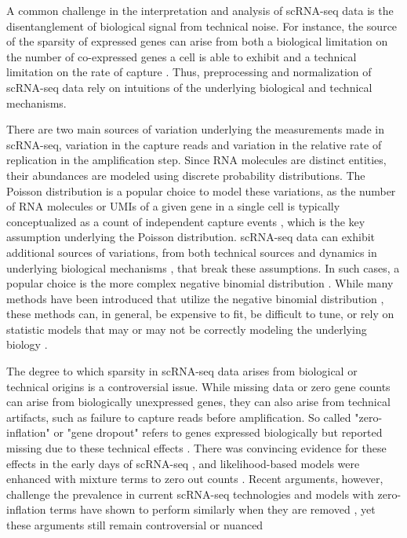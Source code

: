 A common challenge in the interpretation and analysis of scRNA-seq data is the disentanglement of biological signal from technical noise.
For instance, the source of the sparsity of expressed genes can arise from both a biological limitation on the number of co-expressed genes a cell is able to exhibit and a technical limitation on the rate of capture \cite{breda2021}.
Thus, preprocessing and normalization of scRNA-seq data rely on intuitions of the underlying biological and technical mechanisms.

There are two main sources of variation underlying the measurements made in scRNA-seq,
variation in the capture reads and variation in the relative rate of replication in the amplification step.
Since RNA molecules are distinct entities, their abundances are modeled using discrete probability distributions.
The Poisson distribution is a popular choice to model these variations,
as the number of RNA molecules or UMIs of a given gene in a single cell is typically conceptualized as a count of independent capture events \cite{breda2021,more},
which is the key assumption underlying the Poisson distribution.
scRNA-seq data can exhibit additional sources of variations, from both technical sources and dynamics in underlying biological mechanisms \cite{need},
that break these assumptions.
In such cases, a popular choice is the more complex negative binomial distribution \cite{choudhary2022}.
While many methods have been introduced that utilize the negative binomial distribution \cite{lopez2018, risso2018, eraslan2019},
these methods can, in general, be expensive to fit, be difficult to tune, or rely on statistic models that may or may not be correctly modeling the underlying biology \cite{ahlmann-eltze2023}.

The degree to which sparsity in scRNA-seq data arises from biological or technical origins is a controversial issue.
While missing data or zero gene counts can arise from biologically unexpressed genes, they can also arise from technical artifacts,
such as failure to capture reads before amplification.
So called "zero-inflation" or "gene dropout" refers to genes expressed biologically but reported missing due to these technical effects \cite{silverman2020}.
There was convincing evidence for these effects in the early days of scRNA-seq \cite{vallejos2017},
and likelihood-based models were enhanced with mixture terms to zero out counts \cite{pierson2015, dijk2018, lopez2018, huang2018, eraslan2019}.
Recent arguments, however, challenge the prevalence in current scRNA-seq technologies \cite{svensson2020,jiang2022}
and models with zero-inflation terms have shown to perform similarly when they are removed \cite{vieth2017},
yet these arguments still remain controversial or nuanced \cite{cao2021}

